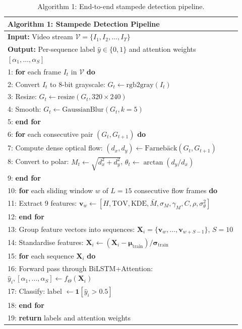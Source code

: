 \begin{table}[H]
\centering
\caption{Algorithm 1: End-to-end stampede detection pipeline.}
\label{alg:pipeline}
\footnotesize
\begin{tabular}{p{0.92\linewidth}}
\toprule
\textbf{Algorithm 1:} Stampede Detection Pipeline \\
\midrule
\textbf{Input:} Video stream $\mathcal{V} = \{I_1, I_2, \ldots, I_T\}$ \\
\textbf{Output:} Per-sequence label $\hat{y} \in \{0, 1\}$ and attention weights $[\alpha_1, \ldots, \alpha_S]$ \\
\midrule
1: \textbf{for} each frame $I_t$ in $\mathcal{V}$ \textbf{do} \\
2: \quad Convert $I_t$ to 8-bit grayscale: $G_t \leftarrow \text{rgb2gray}(I_t)$ \\
3: \quad Resize: $G_t \leftarrow \text{resize}(G_t, 320 \times 240)$ \\
4: \quad Smooth: $G_t \leftarrow \text{GaussianBlur}(G_t, k{=}5)$ \\
5: \textbf{end for} \\
6: \textbf{for} each consecutive pair $(G_t, G_{t+1})$ \textbf{do} \\
7: \quad Compute dense optical flow: $(d_x, d_y) \leftarrow \text{Farneb\"{a}ck}(G_t, G_{t+1})$ \\
8: \quad Convert to polar: $M_t \leftarrow \sqrt{d_x^2 + d_y^2}$, \; $\theta_t \leftarrow \arctan(d_y / d_x)$ \\
9: \textbf{end for} \\
10: \textbf{for} each sliding window $w$ of $L{=}15$ consecutive flow frames \textbf{do} \\
11: \quad Extract 9 features: $\mathbf{v}_w \leftarrow [H, \text{TOV}, \text{KDE}, \bar{M}, \sigma_M, \gamma_M, C, \rho, \sigma^2_\theta]$ \\
12: \textbf{end for} \\
13: Group feature vectors into sequences: $\mathbf{X}_i = \{\mathbf{v}_{w}, \ldots, \mathbf{v}_{w+S-1}\}$, $S{=}10$ \\
14: Standardise features: $\mathbf{X}_i \leftarrow (\mathbf{X}_i - \boldsymbol{\mu}_\text{train}) / \boldsymbol{\sigma}_\text{train}$ \\
15: \textbf{for} each sequence $\mathbf{X}_i$ \textbf{do} \\
16: \quad Forward pass through BiLSTM+Attention: $\hat{y}_i, [\alpha_1, \ldots, \alpha_S] \leftarrow f_\Theta(\mathbf{X}_i)$ \\
17: \quad Classify: label $\leftarrow \mathbf{1}[\hat{y}_i > 0.5]$ \\
18: \textbf{end for} \\
19: \textbf{return} labels and attention weights \\
\bottomrule
\end{tabular}
\end{table}

